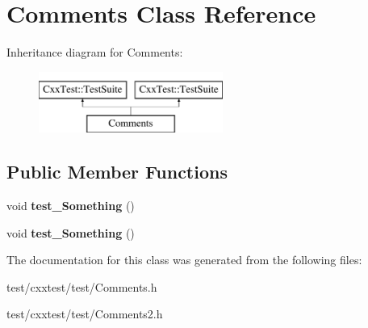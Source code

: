 \hypertarget{classComments}{\section{Comments Class Reference}
\label{classComments}
}
Inheritance diagram for Comments\-:\begin{figure}[H]
\begin{center}
\leavevmode
\includegraphics[height=2.000000cm]{classComments}
\end{center}
\end{figure}
\subsection*{Public Member Functions}
\begin{DoxyCompactItemize}
\item 
\hypertarget{classComments_a369157dd72693c4762e3f93e92af16d7}{void {\bfseries test\-\_\-\-Something} ()}\label{classComments_a369157dd72693c4762e3f93e92af16d7}

\item 
\hypertarget{classComments_a369157dd72693c4762e3f93e92af16d7}{void {\bfseries test\-\_\-\-Something} ()}\label{classComments_a369157dd72693c4762e3f93e92af16d7}

\end{DoxyCompactItemize}


The documentation for this class was generated from the following files\-:\begin{DoxyCompactItemize}
\item 
test/cxxtest/test/Comments.\-h\item 
test/cxxtest/test/Comments2.\-h\end{DoxyCompactItemize}
